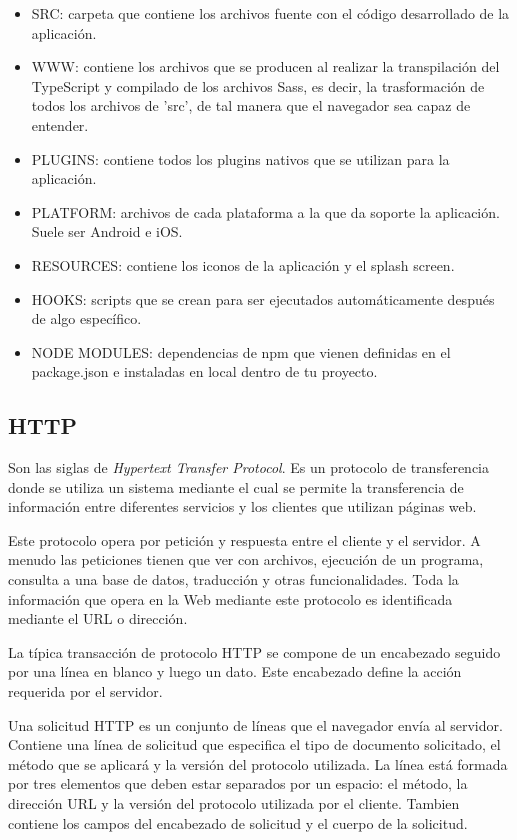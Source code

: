 \documentclass[a4paper, 12pt]{book}
\begin{document}
\begin{itemize}
  \item SRC: carpeta que contiene los archivos fuente con el c\'odigo desarrollado de la aplicaci\'on.
 \item WWW: contiene los archivos que se producen al realizar la transpilaci\'on del TypeScript y compilado de los archivos Sass, es decir, la trasformaci\'on de todos los archivos de 'src', de tal manera que el navegador sea capaz de entender.
 \item PLUGINS: contiene todos los plugins nativos que se utilizan para la aplicaci\'on.
 \item PLATFORM: archivos de cada plataforma a la que da soporte la aplicaci\'on. Suele ser Android e iOS.
 \item RESOURCES: contiene los iconos de la aplicaci\'on y el splash screen.
 \item HOOKS: scripts que se crean para ser ejecutados autom\'aticamente despu\'es de algo espec\'ifico.
\item NODE MODULES: dependencias de npm que vienen definidas en el package.json e instaladas en local dentro de tu proyecto.

\end{itemize}

\subsection{HTTP}
\label{subsec:estilo}

Son las siglas de \emph{Hypertext Transfer Protocol}\cite{HTTP}. Es un protocolo de transferencia donde se utiliza un sistema mediante el cual se permite la transferencia de informaci\'on entre diferentes servicios y los clientes que utilizan p\'aginas web.

Este protocolo opera por petici\'on y respuesta entre el cliente y el servidor. A menudo las peticiones tienen que ver con archivos, ejecuci\'on de un programa, consulta a una base de datos, traducci\'on y otras funcionalidades. Toda la informaci\'on que opera en la Web mediante este protocolo es identificada mediante el URL o direcci\'on.

La t\'ipica transacci\'on de protocolo HTTP se compone de un encabezado seguido por una l\'inea en blanco y luego un dato. Este encabezado define la acci\'on requerida por el servidor.

Una solicitud HTTP es un conjunto de l\'ineas que el navegador env\'ia al servidor. Contiene una l\'inea de solicitud que especifica el tipo de documento solicitado, el m\'etodo que se aplicar\'a y la versi\'on del protocolo utilizada. La l\'inea est\'a formada por tres elementos que deben estar separados por un espacio: el m\'etodo, la direcci\'on URL y la versi\'on del protocolo utilizada por el cliente. Tambien contiene los campos del encabezado de solicitud y el cuerpo de la solicitud.
\end{document}

